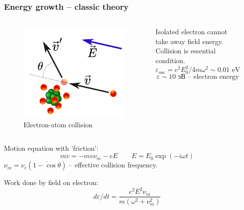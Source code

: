 \documentclass{beamer}
\begin{document}
	\begin{frame}
		\frametitle{Energy growth -- classic theory}
		
		
		
		\begin{columns}
			\begin{figure}
				\centering
				\includegraphics[width=0.8\linewidth]{res/collision.png}
				\caption*{Electron-atom collision}
			\end{figure}
			
			Isolated electron cannot take away field energy. Collision is essential condition.
			$$ \varepsilon_{\text{osc}} = e^2 E_0^2/4m\omega^2 \sim 0.01 \text{ eV}$$
			$$ \varepsilon \sim 10 \text{ эВ} \text{ -- electron energy}$$
			\begin{center}
			\end{center}
		\end{columns}
		
		Motion equation with 'friction':
		$$ m \dot{v} = - m v \nu_m - e E \qquad E = E_0 \exp(-i \omega t)$$
		$\nu_m = \nu_c (\overline{1 - \cos \theta})$ -- effective collision frequency.
		
		Work done by field on electron:
		\begin{equation}
			\boxed{d\varepsilon/dt = \frac{e^2 E^2 \nu_m}{m (\omega^2 + \nu_m^2)}
				\label{eq:energy_growth}}
		\end{equation}
		

\end{frame}
\end{document}

